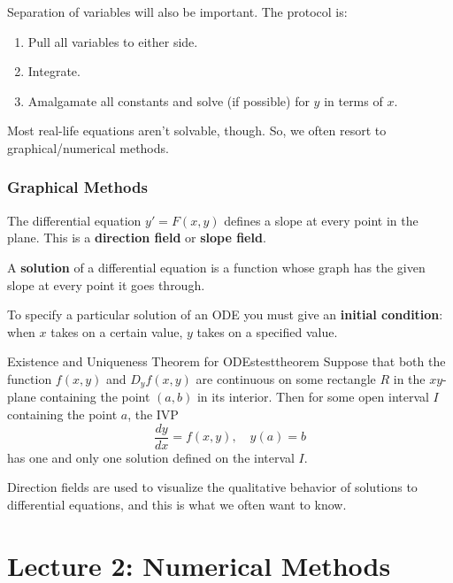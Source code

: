 \documentclass{article}
\begin{document}
Separation of variables will also be important. The protocol is:
\begin{enumerate}
\item Pull all variables to either side.
\item Integrate.
\item Amalgamate all constants and solve (if possible) for $y$ in terms of $x$.
\end{enumerate}

Most real-life equations aren't solvable, though. So, we often resort to graphical/numerical methods.

\subsubsection{Graphical Methods}

The differential equation $y' = F(x, y)$ defines a slope at every point in the plane. This is a \textbf{direction field} or \textbf{slope field}.

A \textbf{solution} of a differential equation is a function whose graph has the given slope at every point it goes through.

To specify a particular solution of an ODE you must give an \textbf{initial condition}: when $x$ takes on a certain value, $y$ takes on a specified value.

\begin{Theorem}{Existence and Uniqueness Theorem for ODEs}{testtheorem}
   Suppose that both the function $f(x, y)$ and $D_y f(x, y)$ are continuous on some rectangle $R$ in the $xy$-plane containing the point $(a, b)$ in its interior. Then for some open interval $I$ containing the point $a$, the IVP
  \begin{equation}
    \label{eq:ivp_existence_uniqueness_theorem}
    \frac{dy}{dx} = f(x, y), \quad y(a) = b
  \end{equation}
  has one and only one solution defined on the interval $I$.
\end{Theorem}

Direction fields are used to visualize the qualitative behavior of solutions to differential equations, and this is what we often want to know.

\section{Lecture 2: Numerical Methods}
\end{document}
